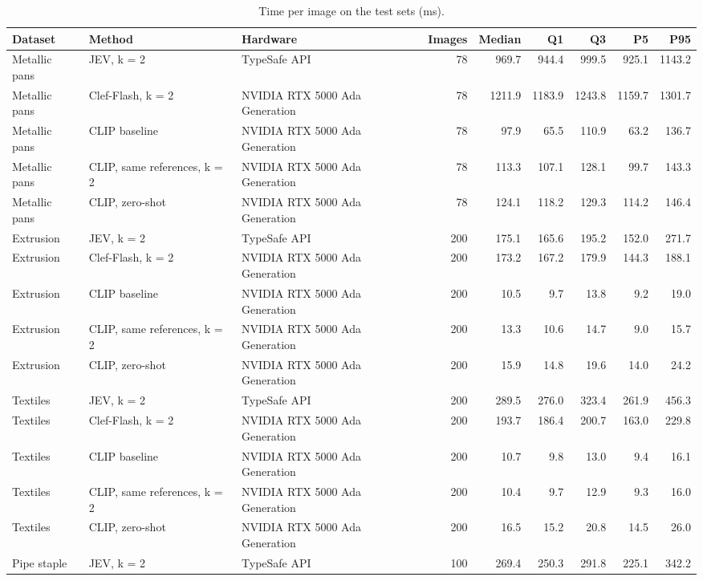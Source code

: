\begin{table}

\caption{\label{tab:tbl-time}Time per image on the test sets (ms).}
\centering
\begin{tabular}[t]{lllrrrrrr}
\toprule
Dataset & Method & Hardware & Images & Median & Q1 & Q3 & P5 & P95\\
\midrule
Metallic pans & JEV, k = 2 & TypeSafe API & 78 & 969.7 & 944.4 & 999.5 & 925.1 & 1143.2\\
Metallic pans & Clef-Flash, k = 2 & NVIDIA RTX 5000 Ada Generation & 78 & 1211.9 & 1183.9 & 1243.8 & 1159.7 & 1301.7\\
Metallic pans & CLIP baseline & NVIDIA RTX 5000 Ada Generation & 78 & 97.9 & 65.5 & 110.9 & 63.2 & 136.7\\
Metallic pans & CLIP, same references, k = 2 & NVIDIA RTX 5000 Ada Generation & 78 & 113.3 & 107.1 & 128.1 & 99.7 & 143.3\\
Metallic pans & CLIP, zero-shot & NVIDIA RTX 5000 Ada Generation & 78 & 124.1 & 118.2 & 129.3 & 114.2 & 146.4\\
\addlinespace
Extrusion & JEV, k = 2 & TypeSafe API & 200 & 175.1 & 165.6 & 195.2 & 152.0 & 271.7\\
Extrusion & Clef-Flash, k = 2 & NVIDIA RTX 5000 Ada Generation & 200 & 173.2 & 167.2 & 179.9 & 144.3 & 188.1\\
Extrusion & CLIP baseline & NVIDIA RTX 5000 Ada Generation & 200 & 10.5 & 9.7 & 13.8 & 9.2 & 19.0\\
Extrusion & CLIP, same references, k = 2 & NVIDIA RTX 5000 Ada Generation & 200 & 13.3 & 10.6 & 14.7 & 9.0 & 15.7\\
Extrusion & CLIP, zero-shot & NVIDIA RTX 5000 Ada Generation & 200 & 15.9 & 14.8 & 19.6 & 14.0 & 24.2\\
\addlinespace
Textiles & JEV, k = 2 & TypeSafe API & 200 & 289.5 & 276.0 & 323.4 & 261.9 & 456.3\\
Textiles & Clef-Flash, k = 2 & NVIDIA RTX 5000 Ada Generation & 200 & 193.7 & 186.4 & 200.7 & 163.0 & 229.8\\
Textiles & CLIP baseline & NVIDIA RTX 5000 Ada Generation & 200 & 10.7 & 9.8 & 13.0 & 9.4 & 16.1\\
Textiles & CLIP, same references, k = 2 & NVIDIA RTX 5000 Ada Generation & 200 & 10.4 & 9.7 & 12.9 & 9.3 & 16.0\\
Textiles & CLIP, zero-shot & NVIDIA RTX 5000 Ada Generation & 200 & 16.5 & 15.2 & 20.8 & 14.5 & 26.0\\
\addlinespace
Pipe staple & JEV, k = 2 & TypeSafe API & 100 & 269.4 & 250.3 & 291.8 & 225.1 & 342.2\\

\end{tabular}
\end{table}
